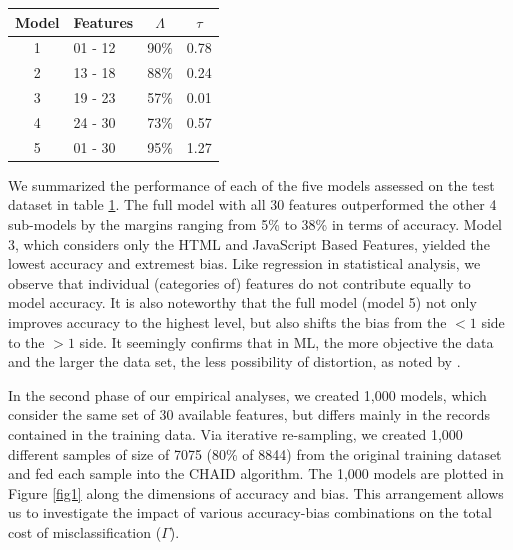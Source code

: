 \documentclass[]{interact}
\theoremstyle{plain}%
\theoremstyle{definition}
\theoremstyle{remark}
\begin{document}
\begin{table}
	
	{\begin{tabular}{clcc} \toprule 
			 Model &  Features &  $\varLambda$  & $\tau$ \\ \midrule
			 1  &01 - 12  &  90\% & 0.78 \\
			 2 &  13 - 18 &  88\% & 0.24 \\
			 3  &  19 - 23 &  57\% & 0.01 \\
			 4  &  24 - 30 &  73\% & 0.57 \\
			 5  &  01 - 30  &  95\% & 1.27 \\
			\bottomrule
	\end{tabular}}
	\label{tab3}
\end{table}

We summarized the performance  of each of the five models  assessed on the test dataset in table \ref{tab3}. The full model with all 30 features outperformed the other 4 sub-models by the margins ranging from 5\% to 38\% in terms of accuracy. Model 3, which considers only  the HTML and JavaScript Based Features, yielded the lowest accuracy and extremest bias. Like regression in statistical analysis, we observe that individual (categories of) features do not contribute equally to model accuracy. It is also noteworthy that the full model (model 5) not only improves accuracy to the highest level, but also shifts the bias from the  $<1$ side to the $>1$  side. It seemingly  confirms that  in ML,  the more objective the data and the larger the data set, the less possibility of distortion, as noted by \cite{Rosso2015}.

In the second phase of our empirical analyses, we created 1,000 models, which  consider the same set of  30 available features, but differs mainly  in the records contained in the training data. Via iterative re-sampling, 
we created 1,000 different samples of size of  7075 (80\% of 8844) from  the original training dataset and fed each sample into the CHAID algorithm.  The 1,000 models are plotted in Figure \ref{fig1} along the dimensions of accuracy and bias. This arrangement allows us to investigate the impact of various accuracy-bias combinations on the total cost of misclassification ($\varGamma$).
\end{document}
